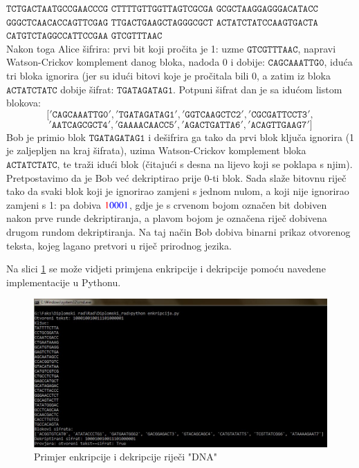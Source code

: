 \documentclass[a4paper,oneside,12pt]{memoir} %
\begin{document}
\begin{spacing}{1.5}
\begin{exa}
$\mathtt{TCTGACTAAT GCCGAACCCG}$
$\mathtt{CTTTTGTTGG TTAGTCGCGA}$
$\mathtt{GCGCTAAGGA GGGACATACC}$\\
$\mathtt{GGGCTCAACA CCAGTTCGAG}$
$\mathtt{TTGACTGAAG CTAGGGCGCT}$
$\mathtt{ACTATCTATC CAAGTGACTA}$\\
$\mathtt{CATGTCTAGG CCATTCCGAA}$
$\mathtt{GTCGTTTAAC}$ \\
Nakon toga Alice šifrira: prvi bit koji pročita je 1: uzme $\mathtt{GTCGTTTAAC}$, napravi Watson-Crickov komplement danog bloka, nadoda $0$ i dobije: $\mathtt{CAGCAAATTG0}$, iduća tri bloka ignorira (jer su idući bitovi koje je pročitala bili $0$, a zatim iz bloka $\mathtt{ACTATCTATC}$ dobije šifrat: $\mathtt{TGATAGATAG1}$. Potpuni šifrat dan je sa idućom listom blokova:
\[\mathtt{['CAGCAAATTG0', 'TGATAGATAG1', 'GGTCAAGCTC2', 'CGCGATTCCT3',}\] \[\mathtt{'AATCAGCGCT4', 'GAAAACAACC5', 'AGACTGATTA6', 'ACAGTTGAAG7']}\]
Bob je primio blok $\mathtt{TGATAGATAG1}$ i dešifrira ga tako da prvi blok ključa ignorira (1 je zaljepljen na kraj šifrata), uzima Watson-Crickov komplement bloka $\mathtt{ACTATCTATC}$, te traži idući blok (čitajući s desna na lijevo koji se poklapa s njim). Pretpostavimo da je Bob već dekriptirao prije $0$-ti blok. Sada slaže bitovnu riječ tako da svaki blok koji je ignorirao zamjeni s jednom nulom, a koji nije ignorirao zamjeni s 1: pa dobiva ${\color{red}1} {\color{blue}0001}$, gdje je s crvenom bojom označen bit dobiven nakon prve runde dekriptiranja, a plavom bojom je označena riječ dobivena drugom rundom dekriptiranja. Na taj način Bob dobiva binarni prikaz otvorenog teksta, kojeg lagano pretvori u riječ prirodnog jezika.
\end{exa}
Na slici \ref{fig:prim} se može vidjeti primjena enkripcije i dekripcije pomoću navedene implementacije u Pythonu.  
\begin{figure}[h]
\centering \includegraphics[scale=0.5]{primjer.jpg}
\caption{Primjer enkripcije i dekripcije riječi "DNA"}
\label{fig:prim}
\end{figure}


\end{spacing}
\end{document}
